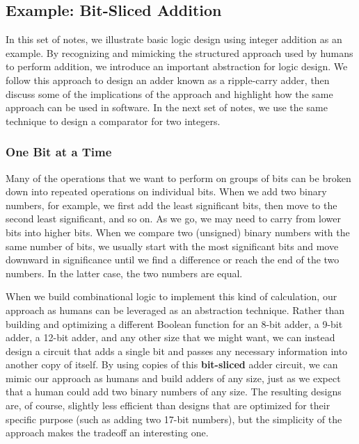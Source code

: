 \classtitle

\subsection{Example: Bit-Sliced Addition}

In this set of notes, we illustrate basic logic design using integer
addition as an example.  By recognizing and mimicking the structured 
approach used by humans to perform addition, we introduce an important 
abstraction for logic design.  We follow this approach to design an
adder known as a ripple-carry adder, then discuss some of the 
implications of the approach and highlight how the same approach can 
be used in software.  In the next set of notes, we use the same
technique to design a comparator for two integers.\\

\subsubsection{One Bit at a Time}

Many of the operations that we want to perform on groups of bits can 
be broken down into repeated operations on individual bits.
%
When we add two binary numbers, for example, we first add the least
significant bits, then move to the second least significant, and so on.
As we go, we may need to carry from lower bits into higher bits.
%
When we compare two (unsigned) binary numbers with the same number of bits,
we usually start with the most significant bits and move downward in
significance until we find a difference or reach the end of the two 
numbers.  In the latter case, the two numbers are equal.

When we build combinational logic to implement this kind of calculation,
our approach as humans can be leveraged as an abstraction technique.
Rather than building and optimizing a different Boolean function for 
an 8-bit adder, a 9-bit adder, a 12-bit adder, and any other size
that we might want, we can instead design a circuit that adds a single
bit and passes any necessary information into another copy of itself.
By using copies of this {\bf bit-sliced} adder circuit, we can
mimic our approach as humans and build adders of any size, just as
we expect that a human could add two binary numbers of any size.
%
The resulting designs are, of course, slightly less efficient than
designs that are optimized for their specific purpose (such as adding
two 17-bit numbers), but the simplicity of the approach makes the
tradeoff an interesting one.\\


